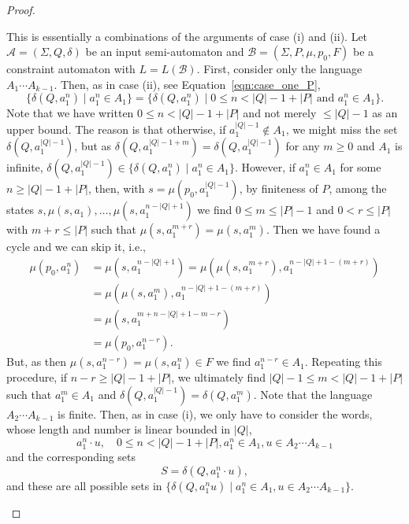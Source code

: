 \begin{proof}
\begin{enumerate}
  This is essentially a combinations of the arguments of case (i) and (ii).
  Let $\mathcal A = (\Sigma, Q, \delta)$ be an input semi-automaton
  and $\mathcal B = (\Sigma, P, \mu, p_0, F)$
  be a constraint automaton with $L = L(\mathcal B)$.
  First, consider only the language $A_1 \cdots A_{k-1}$.
  Then, as in case (ii), see Equation~\eqref{eqn:case_one_P},%
  \[
   \{ \delta(Q, a_1^n) \mid a_1^n \in A_1  \}
    = \{ \delta(Q, a_1^n) \mid 0 \le n < |Q| - 1 + |P|\mbox{ and } a_1^n \in A_1 \}.
  \]
  Note that we have written $0 \le n < |Q| - 1 + |P|$
  and not merely $\le |Q| - 1$ as an upper bound.
  The reason is that otherwise, if $a_1^{|Q|-1} \notin A_1$,
  we might miss the set $\delta(Q, a_1^{|Q|-1})$,
  but as $\delta(Q, a_1^{|Q|-1+m}) = \delta(Q, a_1^{|Q|-1})$
  for any $m \ge 0$ and $A_1$ is infinite, $\delta(Q, a_1^{|Q|-1}) \in \{ \delta(Q, a_1^n) \mid a_1^n \in A_1  \}$.
  However, if $a_1^n \in A_1$ for some $n \ge |Q| - 1 + |P|$,
  then, with $s = \mu(p_0, a_1^{|Q| - 1})$,
  by finiteness of $P$, among
  the states $s, \mu(s,a_1), \ldots, \mu(s, a_1^{n - |Q| + 1})$
  we find $0 \le m \le |P| - 1$ and $0 < r \le |P|$ with $m + r \le |P|$
  such that $\mu(s, a_1^{m+r}) = \mu(s, a_1^m)$.
  Then we have found a cycle and we can skip it, i.e.,
  \begin{align*}
   \mu(p_0, a_1^n) & = \mu(s, a_1^{n - |Q| + 1}) 
                     = \mu(\mu(s, a_1^{m+r}), a_1^{n - |Q| + 1 - (m+r)}) \\
                   & = \mu(\mu(s, a_1^m), a_1^{n - |Q| + 1 - (m+r)}) \\
                   & = \mu(s, a_1^{m + n - |Q| + 1 - m - r}) \\
                   & = \mu(p_0, a_1^{n-r}).
  \end{align*}
  But, as then $\mu(s, a_1^{n - r}) = \mu(s, a_1^n) \in F$
  we find $a_1^{n-r} \in A_1$. 
  Repeating this procedure, if $n - r \ge |Q| - 1 + |P|$,
  we ultimately find $|Q| - 1 \le m < |Q| - 1 + |P|$
  such that $a_1^m \in A_1$
  and $\delta(Q, a_1^{|Q| - 1}) = \delta(Q, a_1^m)$.
  Note that the language $A_2 \cdots A_{k-1}$
  is finite.
  Then, as in case (i), 
  we only have to consider the  words,
  whose length and number is linear bounded in $|Q|$,
  \[
   a_1^n \cdot u,\quad  0 \le n < |Q| - 1 + |P|, a_1^n \in A_1, u \in A_2 \cdots A_{k-1}
  \]
  and the corresponding sets
  \[
   S = \delta(Q, a_1^n \cdot u),
  \]
  and these are all possible sets in $\{ \delta(Q, a_1^n u) \mid a_1^n \in A_1, u \in A_2 \cdots A_{k-1} \}$.

\end{enumerate}
\end{proof}
